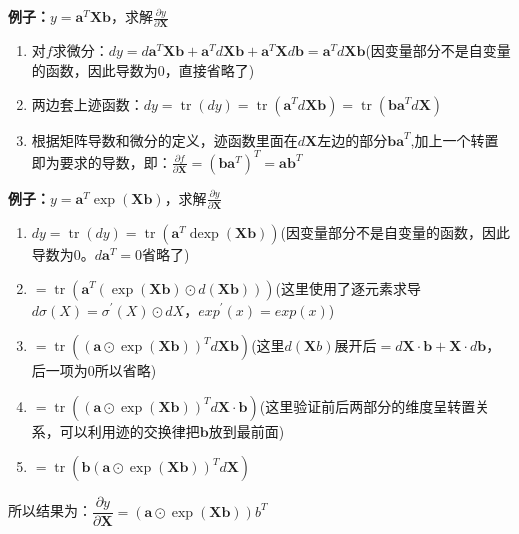     \textbf{例子：}$y=\mathbf{a}^{T} \mathbf{X} \mathbf{b}$，求解$\frac{\partial y}{\partial \mathbf{X}}$
    \begin{enumerate}
        \item 对$f$求微分：$d y=d \mathbf{a}^{T} \mathbf{X} \mathbf{b}+\mathbf{a}^{T} d \mathbf{X} \mathbf{b}+\mathbf{a}^{T} \mathbf{X} d \mathbf{b}=\mathbf{a}^{T} d \mathbf{X} \mathbf{b}$(因变量部分不是自变量的函数，因此导数为0，直接省略了)
        \item 两边套上迹函数：$d y=\operatorname{tr}(d y)=\operatorname{tr}\left(\mathbf{a}^{T} d \mathbf{X} \mathbf{b}\right)=\operatorname{tr}\left(\mathbf{b} \mathbf{a}^{T} d \mathbf{X}\right)$
        \item 根据矩阵导数和微分的定义，迹函数里面在$d\bm{X}$左边的部分$\bm{ba}^T$,加上一个转置即为要求的导数，即：$\frac{\partial f}{\partial \mathbf{X}}=\left(\mathbf{b} \mathbf{a}^{T}\right)^{T}=\bm{a b}^{T}$
    \end{enumerate}
    \textbf{例子：}$y=\mathbf{a}^{T} \exp (\mathbf{X} \mathbf{b})$，求解$\frac{\partial y}{\partial \mathbf{X}}$
    \begin{enumerate}
        \item $d y=\operatorname{tr}(d y)=\operatorname{tr}\left(\mathbf{a}^{T} \operatorname{dexp}(\mathbf{X b})\right)$(因变量部分不是自变量的函数，因此导数为0。$d\bm{a}^T=0$省略了)
        \item $=\operatorname{tr}\left(\mathbf{a}^{T}(\exp (\mathbf{X} \mathbf{b}) \odot d(\mathbf{X} \mathbf{b}))\right)$(这里使用了逐元素求导$d \sigma(X)=\sigma^{\prime}(X) \odot d X$，$exp^{\prime}(x)=exp(x)$)
        \item $=\operatorname{tr}\left((\mathbf{a} \odot \exp (\mathbf{X} \mathbf{b}))^{T} d \mathbf{X} \mathbf{b}\right)$(这里$d(\bm{X}b)$展开后$= d\bm{X}\cdot \bm{b} + \bm{X}\cdot d\bm{b}$，后一项为0所以省略)
        \item $=\operatorname{tr}\left((\mathbf{a} \odot \exp (\mathbf{X} \mathbf{b}))^{T} d \mathbf{X} \cdot \mathbf{b}\right)$(这里验证前后两部分的维度呈转置关系，可以利用迹的交换律把$\bm{b}$放到最前面)
        \item $=\operatorname{tr}\left(\mathbf{b}(\mathbf{a} \odot \exp (\mathbf{X b}))^{T} d \mathbf{X}\right)$
    \end{enumerate}
    所以结果为：$\dfrac{\partial y}{\partial \mathbf{X}}=(\mathbf{a} \odot \exp (\mathbf{X} \mathbf{b})) b^{T}$
